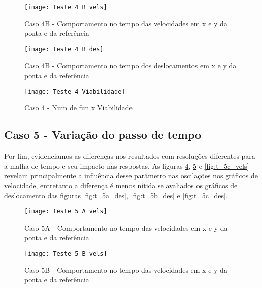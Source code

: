 \begin{figure}[!htb]
    \begin{center}
    \caption{Caso 4B - Comportamento no tempo das velocidades em x e y da ponta e da referência}
    \texttt{[image: Teste 4 B vels]}
    \label{fig:t_4b_vels}
    \end{center}
\end{figure}

\begin{figure}[!htb]
    \begin{center}
    \caption{Caso 4B - Comportamento no tempo dos deslocamentos em x e y da ponta e da referência}
    \texttt{[image: Teste 4 B des]}
    \label{fig:t_4b_des}
    \end{center}
\end{figure}

\begin{figure}[!htb]
    \begin{center}
    \caption{Caso 4 - Num de fun x Viabilidade}
    \texttt{[image: Teste 4 Viabilidade]}
    \label{fig:t_4_viab}
    \end{center}
\end{figure}

\subsection{Caso 5 - Variação do passo de tempo}
Por fim, evidenciamos as diferenças nos resultados com resoluções diferentes para a malha de tempo e seu impacto nas respostas.
As figuras \ref{fig:t_5a_vels}, \ref{fig:t_5b_vels} e \ref{fig:t_5c_vels} revelam principalmente a influência desse parâmetro
nas oscilações nos gráficos de velocidade, entretanto a diferença é menos nítida se avaliados os gráficos de deslocamento das figuras
\ref{fig:t_5a_des}, \ref{fig:t_5b_des} e \ref{fig:t_5c_des}.

\begin{figure}[!htb]
    \begin{center}
    \caption{Caso 5A - Comportamento no tempo das velocidades em x e y da ponta e da referência}
    \texttt{[image: Teste 5 A vels]}
    \label{fig:t_5a_vels}
    \end{center}
\end{figure}

\begin{figure}[!htb]
    \begin{center}
    \caption{Caso 5B - Comportamento no tempo das velocidades em x e y da ponta e da referência}
    \texttt{[image: Teste 5 B vels]}
    \label{fig:t_5b_vels}
    \end{center}
\end{figure}

